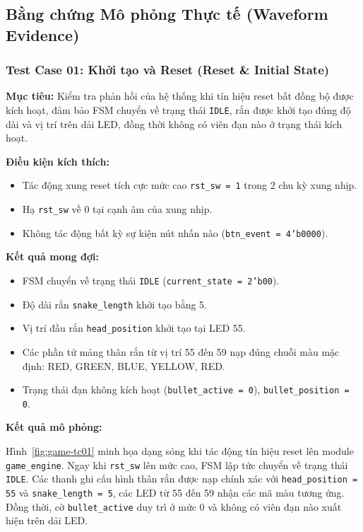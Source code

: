 \documentclass[12pt,a4paper]{article}
\begin{document}
\subsection{Bằng chứng Mô phỏng Thực tế (Waveform Evidence)}

\subsubsection{Test Case 01: Khởi tạo và Reset (Reset \& Initial State)}

\textbf{Mục tiêu:}
Kiểm tra phản hồi của hệ thống khi tín hiệu reset bất đồng bộ được kích hoạt, đảm bảo FSM chuyển về trạng thái \texttt{IDLE}, rắn được khởi tạo đúng độ dài và vị trí trên dải LED, đồng thời không có viên đạn nào ở trạng thái kích hoạt.

\textbf{Điều kiện kích thích:}
\begin{itemize}
    \item Tác động xung reset tích cực mức cao \texttt{rst\_sw = 1} trong 2 chu kỳ xung nhịp.
    \item Hạ \texttt{rst\_sw} về 0 tại cạnh âm của xung nhịp.
    \item Không tác động bất kỳ sự kiện nút nhấn nào (\texttt{btn\_event = 4'b0000}).
\end{itemize}

\textbf{Kết quả mong đợi:}
\begin{itemize}
    \item FSM chuyển về trạng thái \texttt{IDLE} (\texttt{current\_state = 2'b00}).
    \item Độ dài rắn \texttt{snake\_length} khởi tạo bằng 5.
    \item Vị trí đầu rắn \texttt{head\_position} khởi tạo tại LED 55.
    \item Các phần tử mảng thân rắn từ vị trí 55 đến 59 nạp đúng chuỗi màu mặc định: RED, GREEN, BLUE, YELLOW, RED.
    \item Trạng thái đạn không kích hoạt (\texttt{bullet\_active = 0}), \texttt{bullet\_position = 0}.
\end{itemize}

\textbf{Kết quả mô phỏng:}

Hình~\ref{fig:game-tc01} minh họa dạng sóng khi tác động tín hiệu reset lên module \texttt{game\_engine}. Ngay khi \texttt{rst\_sw} lên mức cao, FSM lập tức chuyển về trạng thái \texttt{IDLE}. Các thanh ghi cấu hình thân rắn được nạp chính xác với \texttt{head\_position = 55} và \texttt{snake\_length = 5}, các LED từ 55 đến 59 nhận các mã màu tương ứng. Đồng thời, cờ \texttt{bullet\_active} duy trì ở mức 0 và không có viên đạn nào xuất hiện trên dải LED.
\end{document}
